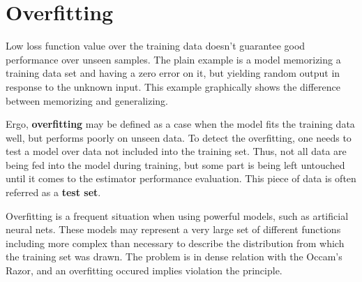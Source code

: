 \documentclass[thesis=B,english]{FITthesis}[2019/12/23]
\begin{document}
\section{Overfitting}

Low loss function value over the training data doesn't guarantee good performance over unseen samples. The plain example is a model memorizing a training data set and having a zero error on it, but yielding random output in response to the unknown input. This example graphically shows the difference between memorizing and generalizing.

Ergo, \textbf{overfitting} may be defined as a case when the model fits the training data well, but performs poorly on unseen data. To detect the overfitting, one needs to test a model over data not included into the training set. Thus, not all data are being fed into the model during training, but some part is being left untouched until it comes to the estimator performance evaluation. This piece of data is often referred as a \textbf{test set}.

Overfitting is a frequent situation when using powerful models, such as artificial neural nets. These models may represent a very large set of different functions including more complex than necessary to describe the distribution from which the training set was drawn. The problem is in dense relation with the Occam's Razor, and an overfitting occured implies violation the principle\cite{overfitting}.
\end{document}
